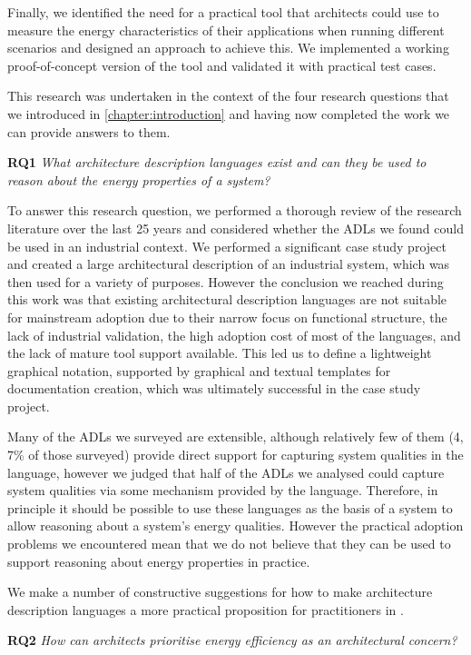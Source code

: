 Finally, we identified the need for a practical tool that architects could use to measure the energy characteristics of their applications when running different scenarios and designed an approach to achieve this.  We implemented a working proof-of-concept version of the tool and validated it with practical test cases.

This research was undertaken in the context of the four research questions that we introduced in \cref{chapter:introduction} and having now completed the work we can provide answers to them.

\textbf{RQ1} \emph{What architecture description languages exist and can they be used to reason about the energy properties of a system?}

To answer this research question, we performed a thorough review of the research literature over the last 25 years and considered whether the ADLs we found could be used in an industrial context.  We performed a significant case study project and created a large architectural description of an industrial system, which was then used for a variety of purposes.  However the conclusion we reached during this work was that existing architectural description languages are not suitable for mainstream adoption due to their narrow focus on functional structure, the lack of industrial validation, the high adoption cost of most of the languages, and the lack of mature tool support available.  This led us to define a lightweight graphical notation, supported by graphical and textual templates for documentation creation, which was ultimately successful in the case study project.

Many of the ADLs we surveyed are extensible, although relatively few of them (4, 7\% of those surveyed) provide direct support for capturing system qualities in the language, however we judged that half of the ADLs we analysed could capture system qualities via some mechanism provided by the language.  Therefore, in principle it should be possible to use these languages as the basis of a system to allow reasoning about a system's energy qualities.  However the practical adoption problems we encountered mean that we do not believe that they can be used to support reasoning about energy properties in practice.

We make a number of constructive suggestions for how to make architecture description languages a more practical proposition for practitioners in
 .

\textbf{RQ2} \emph{How can architects prioritise energy efficiency as an architectural concern?}

